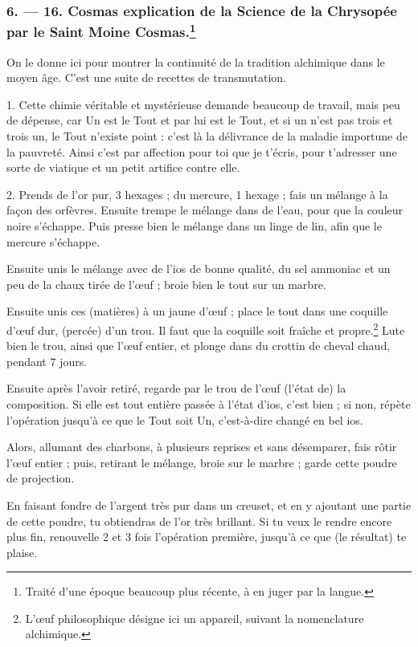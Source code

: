 \documentclass[a4paper, 11pt, oneside, polutonikogreek, french]{article}
\begin{document}
\bigskip
\centerline{\EightStarTaper}
\centerline{\EightStarTaper\EightStarTaper}
\bigskip

\subsubsection[6. --- 16. Cosmas explication de la Science de la Chrysopée par le Saint Moine Cosmas.]{6. --- 16. Cosmas explication de la Science de la Chrysopée par le Saint Moine Cosmas.\footnote{Traité d'une époque beaucoup plus récente, à en juger par la langue.  }}

On le donne ici pour montrer la continuité de la tradition alchimique dans le moyen âge. C'est une suite de recettes de transmutation.

1. Cette chimie véritable et mystérieuse demande beaucoup de travail, mais peu de dépense, car Un est le Tout et par lui est le Tout, et si un n'est pas trois et trois un, le Tout n'existe point : c'est là la délivrance de la maladie importune de la pauvreté. Ainsi c'est par affection pour toi que je t'écris, pour t'adresser une sorte de viatique et un petit artifice contre elle.

2. Prends de l'or pur, 3 hexages ; du mercure, 1 hexage ; fais un mélange à la façon des orfèvres. Ensuite trempe le mélange dans de l'eau, pour que la couleur noire s'échappe. Puis presse bien le mélange dans un linge de lin, afin que le mercure s'échappe.

Ensuite unis le mélange avec de l'ios de bonne qualité, du sel ammoniac et un peu de la chaux tirée de l'œuf ; broie bien le tout sur un marbre.

Ensuite unis ces (matières) à un jaune d'œuf ; place le tout dans une coquille d'œuf dur, (percée) d'un trou. Il faut que la coquille soit fraîche et propre.\footnote{L'œuf philosophique désigne ici un appareil, suivant la nomenclature alchimique.} Lute bien le trou, ainsi que l'œuf entier, et plonge dans du crottin de cheval chaud, pendant 7 jours.

Ensuite après l'avoir retiré, regarde par le trou de l'œuf (l'état de) la composition. Si elle est tout entière passée à l'état d'ios, c'est bien ; si non, répète l'opération jusqu'à ce que le Tout soit Un, c'est-à-dire changé en bel ios.

Alors, allumant des charbons, à plusieurs reprises et sans désemparer, fais rôtir l'œuf entier ; puis, retirant le mélange, broie sur le marbre ; garde cette poudre de projection.

En faisant fondre de l'argent très pur dans un creuset, et en y ajoutant une partie de cette poudre, tu obtiendras de l'or très brillant. Si tu veux le rendre encore plus fin, renouvelle 2 et 3 fois l'opération première, jusqu'à ce que (le résultat) te plaise.
\end{document}
